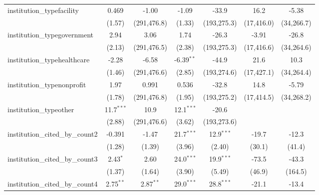 \begin{tabular}{lcccccc}
   institution\_typefacility             & 0.469         & -1.00         & -1.09         & -33.9         & 16.2         & -5.38\\   
                                         & (1.57)        & (291,476.8)   & (1.33)        & (193,275.3)   & (17,416.0)   & (34,266.7)\\   
   institution\_typegovernment           & 2.94          & 3.06          & 1.74          & -26.3         & -3.91        & -26.8\\   
                                         & (2.13)        & (291,476.5)   & (2.38)        & (193,275.3)   & (17,416.6)   & (34,264.6)\\   
   institution\_typehealthcare           & -2.28         & -6.58         & -6.39$^{**}$  & -44.9         & 21.6         & 10.3\\   
                                         & (1.46)        & (291,476.6)   & (2.85)        & (193,274.6)   & (17,427.1)   & (34,264.4)\\   
   institution\_typenonprofit            & 1.97          & 0.991         & 0.536         & -32.8         & 14.8         & -5.79\\   
                                         & (1.78)        & (291,476.8)   & (1.95)        & (193,275.2)   & (17,414.5)   & (34,268.2)\\   
   institution\_typeother                & 11.7$^{***}$  & 10.9          & 12.1$^{***}$  & -20.6         &              &   \\   
                                         & (2.88)        & (291,476.6)   & (3.62)        & (193,273.6)   &              &   \\   
   institution\_cited\_by\_count2        & -0.391        & -1.47         & 21.7$^{***}$  & 12.9$^{***}$  & -19.7        & -12.3\\   
                                         & (1.28)        & (1.39)        & (3.96)        & (2.40)        & (30.1)       & (41.4)\\   
   institution\_cited\_by\_count3        & 2.43$^{*}$    & 2.60          & 24.0$^{***}$  & 19.9$^{***}$  & -73.5        & -43.3\\   
                                         & (1.37)        & (1.64)        & (3.90)        & (5.49)        & (46.9)       & (164.5)\\   
   institution\_cited\_by\_count4        & 2.75$^{**}$   & 2.87$^{**}$   & 29.0$^{***}$  & 28.8$^{***}$  & -21.1        & -13.4\\   

\end{tabular}
